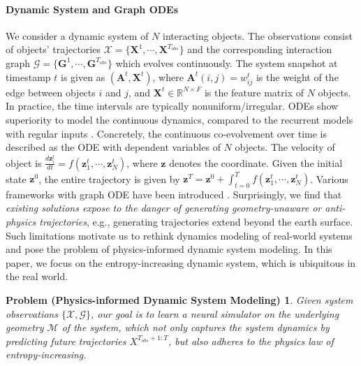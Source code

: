 \paragraph{Dynamic System and Graph ODEs} 
We consider a dynamic system of $N$ interacting objects.
The observations consist of objects' trajectories $\mathcal X=\{ \boldsymbol X^1, \cdots, \boldsymbol X^{T_{obs}}\}$ 
and the corresponding interaction graph $\mathcal G=\{ \boldsymbol G^1, \cdots, \boldsymbol G^{T_{obs}}\}$ which evolves continuously.
The system snapshot at timestamp $t$ is given as $(\boldsymbol A^t, \boldsymbol X^t)$, 
where $\boldsymbol A^t(i,j)=w_{ij}^t$ is the weight of the edge between objects $i$ and $j$, and $\boldsymbol X^t\in \mathbb R^{N \times F}$ is the feature matrix of $N$ objects.
In practice, the time intervals are typically nonuniform/irregular.
ODEs show superiority to  model the continuous dynamics, compared to the recurrent models with regular inputs \cite{nips18NODE}.
Concretely, the continuous co-evolvement over  time is described as the ODE with dependent variables of $N$ objects.
The velocity of object is $\frac{d \boldsymbol z_i^t}{d t}=f(\boldsymbol z_1^t, \cdots, \boldsymbol z_N^t)$, 
where $\boldsymbol z$ denotes the coordinate.
Given the initial state $\boldsymbol  z^0$, the entire trajectory is given by
$\boldsymbol  z^T=\boldsymbol  z^0+\int_{t=0}^T f(\boldsymbol z_1^t, \cdots, \boldsymbol z_N^t)$.
Various frameworks with graph ODE have been introduced \cite{kdd21CoupledGraphODE,www24CausalGraphODE,icml23HOPE}.
Surprisingly, we find that \emph{existing solutions expose to the danger of generating geometry-unaware or anti-physics trajectories}, 
e.g., generating trajectories extend beyond the earth surface.
Such limitations motivate us to rethink dynamics modeling of real-world systems and pose the problem 
of physics-informed dynamic system modeling.
In this paper, we focus on the entropy-increasing dynamic system, which is ubiquitous in the real world.
\newtheorem*{def1}{Problem (Physics-informed Dynamic System Modeling)}
\begin{def1}
Given system observations  $\{\mathcal X, \mathcal G\}$, 
our goal is to learn a neural simulator on the underlying geometry $\mathcal M$ of the system, 
which not only captures the system dynamics by predicting future trajectories $X^{T_{obs}+1:T}$, 
but also adheres to the physics law of entropy-increasing.
\end{def1}



